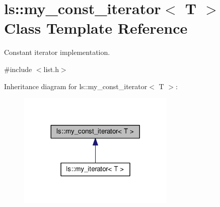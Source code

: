 \hypertarget{classls_1_1my__const__iterator}{}\section{ls\+:\+:my\+\_\+const\+\_\+iterator$<$ T $>$ Class Template Reference}
\label{classls_1_1my__const__iterator}


Constant iterator implementation.  




{\ttfamily \#include $<$list.\+h$>$}



Inheritance diagram for ls\+:\+:my\+\_\+const\+\_\+iterator$<$ T $>$\+:\nopagebreak
\begin{figure}[H]
\begin{center}
\leavevmode
\includegraphics[width=212pt]{classls_1_1my__const__iterator__inherit__graph}
\end{center}
\end{figure}
